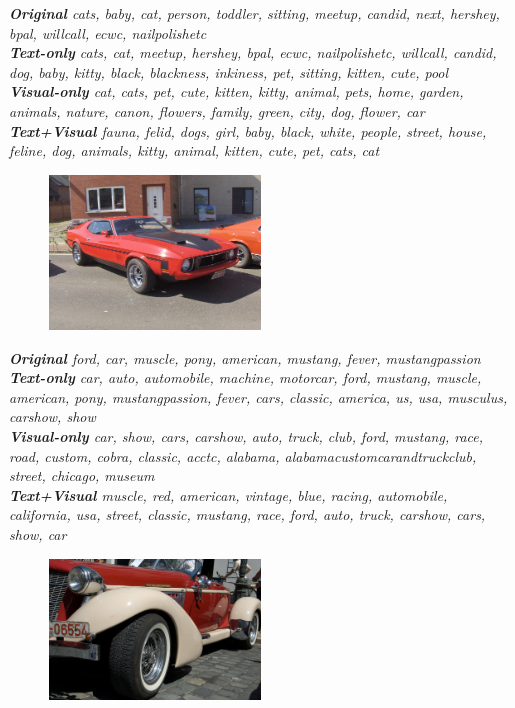 \documentclass[12pt]{article}
\begin{document}
\emph{\textbf{Original} cats, baby, cat, person, toddler, sitting, meetup, candid, next, hershey, bpal, willcall, ecwc, nailpolishetc\\
\textbf{Text-only} cats, cat, meetup, hershey, bpal, ecwc, nailpolishetc, willcall, candid, dog, baby, kitty, black, blackness, inkiness, pet, sitting, kitten, cute, pool\\
\textbf{Visual-only} cat, cats, pet, cute, kitten, kitty, animal, pets, home, garden, animals, nature, canon, flowers, family, green, city, dog, flower, car\\
\textbf{Text+Visual} fauna, felid, dogs, girl, baby, black, white, people, street,
house, feline, dog, animals, kitty, animal, kitten, cute, pet, cats, cat}

\begin{figure}[H]
\includegraphics[width=0.5\textwidth]{examples/car2.jpg}
\end{figure}

\emph{\textbf{Original} ford, car, muscle, pony, american, mustang, fever, mustangpassion\\
\textbf{Text-only} car, auto, automobile, machine, motorcar, ford, mustang, muscle, american, pony, mustangpassion, fever, cars, classic, america, us, usa, musculus, carshow, show\\
\textbf{Visual-only} car, show, cars, carshow, auto, truck, club, ford, mustang, race, road, custom, cobra, classic, acctc, alabama, alabamacustomcarandtruckclub, street, chicago, museum\\
\textbf{Text+Visual} muscle, red, american, vintage, blue, racing, automobile, california, usa, street, classic, mustang, race, ford, auto, truck, carshow, cars, show, car
}


\begin{figure}[H]
\includegraphics[width=0.5\textwidth]{examples/car1.jpg}
\end{figure}
\end{document}

